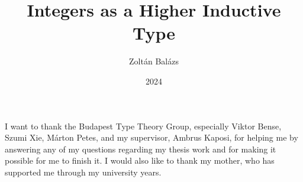 \documentclass[
]{elteikthesis}[2024/04/26]
\title{Integers as a Higher Inductive Type} %
\date{2024} %
\author{Zoltán Balázs}
\affiliation{Associate Professor} %
\begin{document}


\maketitle


\tableofcontents
\cleardoublepage


\cleardoublepage


\cleardoublepage


\cleardoublepage


\cleardoublepage


\cleardoublepage


\cleardoublepage


\cleardoublepage

\chapter*{\acklabel}
I want to thank the Budapest Type Theory Group, especially Viktor Bense, Szumi Xie, Márton Petes, and my supervisor, Ambrus Kaposi, for helping me by answering any of my questions regarding my thesis work and for making it possible for me to finish it.
I would also like to thank my mother, who has supported me through my university years.

{}
\printbibliography[title=\biblabel]
\cleardoublepage

{}
\lstlistoflistings
\cleardoublepage

\end{document}
